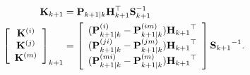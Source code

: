 \begin{align}
\begin{split}
{\bf K}_{k+1}&={\bf P}_{k+1|k}{\bf H}_{k+1}^\top{\bf S}_{k+1}^{-1}\\
            \left[
              \begin{array}{c}
                {\bf K}^{(i)} \\
                {\bf K}^{(j)} \\
                {\bf K}^{(m)} \\
              \end{array}
            \right]_{k+1}&=\left[
              \begin{array}{c}
                ({\bf P}_{k+1|k}^{(i)}-{\bf P}_{k+1|k}^{(im)}){{\bf H}_{k+1}}^\top \\
                ({\bf P}_{k+1|k}^{(ji)}-{\bf P}_{k+1|k}^{(jm)}){{\bf H}_{k+1}}^\top \\
                ({\bf P}_{k+1|k}^{(mi)}-{\bf P}_{k+1|k}^{(m)}){{\bf H}_{k+1}}^\top \\
              \end{array}
            \right]{{\bf S}_{k+1}}^{-1}.\\
\end{split}
\label{eq:KalmanGain}
\end{align}
